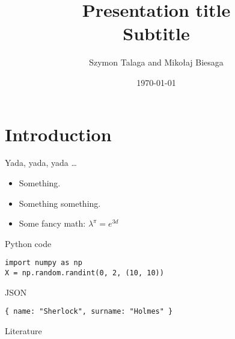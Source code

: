 \title[Presentation]{
    Presentation title \\
    \small{Subtitle}
}
\author[]{Szymon Talaga and Mikołaj Biesaga} %
\date{\today} %

\frame{\titlepage}

\section{Introduction}

\begin{frame}{Yada, yada, yada \ldots}
\begin{itemize}
    \item Something.
    \item Something something.
    \item Some fancy math: $\lambda^\pi = e^{3d}$
\end{itemize}
\end{frame}

\begin{frame}[fragile]{Python code}
\begin{verbatim}
import numpy as np
X = np.random.randint(0, 2, (10, 10))
\end{verbatim}
\end{frame}

\begin{frame}[fragile]{JSON}
\begin{verbatim}
{ name: "Sherlock", surname: "Holmes" }
\end{verbatim}
\end{frame}

\begin{frame}{Literature}
\nocite{*}
\AtNextBibliography{\footnotesize}
\printbibliography
\end{frame}
